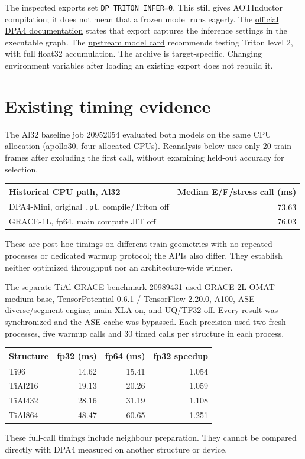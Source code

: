 \documentclass[11pt,a4paper]{article}
\begin{document}
The inspected exports set \texttt{DP\_TRITON\_INFER=0}.
This still gives AOTInductor compilation; it does not mean that a frozen model
runs eagerly. The
\href{https://docs.deepmodeling.com/projects/deepmd/en/v3.2.0/model/dpa4.html}{official DPA4 documentation}
states that export captures the inference settings in the executable graph.
The
\href{https://huggingface.co/deepmodelingcommunity/DPA4-OMat24}{upstream model card}
recommends testing Triton level 2, with full float32 accumulation. The archive is
target-specific. Changing environment variables after loading an existing
export does not rebuild it.

\section*{Existing timing evidence}
The Al32 baseline job 20952054 evaluated both models on the same CPU allocation
(apollo30, four allocated CPUs). Reanalysis below uses only 20 train frames after
excluding the first call, without examining held-out accuracy for selection.
\begin{center}
\begin{tabular}{@{}lr@{}}
\toprule
Historical CPU path, Al32 & Median E/F/stress call (ms)\\
\midrule
DPA4-Mini, original \texttt{.pt}, compile/Triton off & 73.63\\
GRACE-1L, fp64, main compute JIT off & 76.03\\
\bottomrule
\end{tabular}
\end{center}
These are post-hoc timings on different train geometries with no repeated
processes or dedicated warmup protocol; the APIs also differ. They establish
neither optimized throughput nor an architecture-wide winner.

The separate TiAl GRACE benchmark 20989431 used GRACE-2L-OMAT-medium-base,
TensorPotential 0.6.1 / TensorFlow 2.20.0, A100, ASE diverse/segment engine,
main XLA on, and UQ/TF32 off. Every result was synchronized and the ASE cache
was bypassed. Each precision used two fresh processes, five warmup calls and
30 timed calls per structure in each process.
\begin{center}
\begin{tabular}{@{}lrrr@{}}
\toprule
Structure & fp32 (ms) & fp64 (ms) & fp32 speedup\\
\midrule
Ti96 & 14.62 & 15.41 & 1.054\\
TiAl216 & 19.13 & 20.26 & 1.059\\
TiAl432 & 28.16 & 31.19 & 1.108\\
TiAl864 & 48.47 & 60.65 & 1.251\\
\bottomrule
\end{tabular}
\end{center}
These full-call timings include neighbour preparation. They cannot be compared
directly with DPA4 measured on another structure or device.
\end{document}
